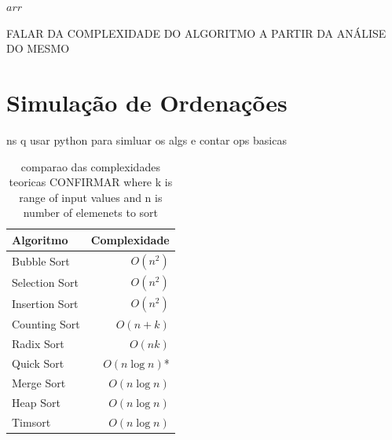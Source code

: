 \documentclass[conference]{IEEEtran}
\begin{document}
\begin{algorithm}[H]
\begin{algorithmic}[1]
            \State \Return $arr$
        \EndFunction
    
        \State {}
    \end{algorithmic}
\end{algorithm}

FALAR DA COMPLEXIDADE DO ALGORITMO A PARTIR DA ANÁLISE DO MESMO

\section{Simulação de Ordenações}

ns q usar python para simluar os algs e contar ops basicas

\begin{table}[H]
\centering
\caption{comparao das complexidades teoricas CONFIRMAR where k is  range of input values and n is number of elemenets to sort}
\label{tab:complexidades}
\begin{tabular}{lr}
\toprule
\textbf{Algoritmo} & \textbf{Complexidade} \\
\midrule
Bubble Sort & $O(n^2)$ \\
Selection Sort & $O(n^2)$ \\
Insertion Sort & $O(n^2)$ \\
Counting Sort & $O(n + k)$ \\
Radix Sort & $O(nk)$ \\
Quick Sort & $O(n \log n)$* \\
Merge Sort & $O(n \log n)$ \\
Heap Sort & $O(n \log n)$ \\
Timsort & $O(n \log n)$ \\
\bottomrule
\end{tabular}
\end{table}
\end{document}
